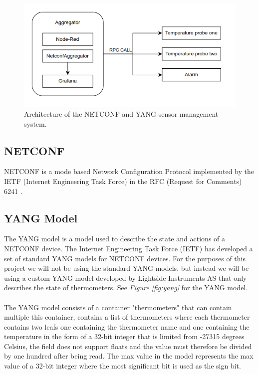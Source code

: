 \documentclass[12pt]{article}
\begin{document}
\newpage

\begin{figure}
  \centering
  \includegraphics[width=\textwidth]{refimparch2.drawio.png}
  \caption{Architecture of the NETCONF and YANG sensor management system.}
  \label{fig:architecture}
\end{figure}

\subsection{NETCONF}
NETCONF \cite{ennsNetworkConfigurationProtocol2011} is a mode based Network Configuration Protocol
implemented by the IETF (Internet Engineering Task Force) in the RFC (Request for Comments) 6241 \cite{ennsNetworkConfigurationProtocol2011}.

\subsection{YANG Model}
The YANG model is a model used to describe the state and actions of a NETCONF device.
The Internet Engineering Task Force (IETF) has developed a set of standard YANG models for NETCONF devices.
For the purposes of this project we will not be using the standard YANG models,
but instead we will be using a custom YANG model developed by Lightside Instruments AS that only 
describes the state of thermometers. See \textit{Figure \ref{fig:yang}} for the YANG model.
\\
\\
The YANG model consists of a container "thermometers" that can contain multiple 
this container, contains a list of thermometers where each thermometer 
contains two leafs one containing the thermometer name and one containing the temperature in the form 
of a 32-bit integer that is limited from -27315 degrees Celsius, the field does not support floats and the value must
therefore be divided by one hundred after being read. The max value in the model represents the max value of a 32-bit integer where the most
significant bit is used as the sign bit.
\end{document}
